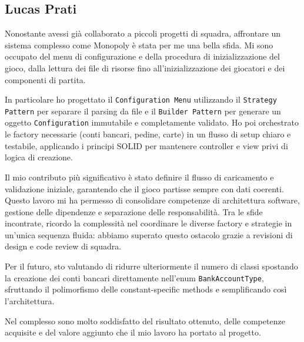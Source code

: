 \subsection{Lucas Prati}

Nonostante avessi già collaborato a piccoli progetti di squadra, affrontare un sistema complesso come Monopoly è stata per me una bella sfida.
Mi sono occupato del menu di configurazione e della procedura di inizializzazione del gioco, dalla lettura dei file di risorse fino all'inizializzazione dei giocatori e dei componenti di partita. \newline

In particolare ho progettato il \texttt{Configuration Menu} utilizzando il \texttt{Strategy Pattern} per separare il parsing da file e il \texttt{Builder Pattern} per generare un oggetto \texttt{Configuration} immutabile e completamente validato.
Ho poi orchestrato le factory necessarie (conti bancari, pedine, carte) in un flusso di setup chiaro e testabile, applicando i principi SOLID per mantenere controller e view privi di logica di creazione. \newline

Il mio contributo più significativo è stato definire il flusso di caricamento e validazione iniziale, garantendo che il gioco partisse sempre con dati coerenti.
Questo lavoro mi ha permesso di consolidare competenze di architettura software, gestione delle dipendenze e separazione delle responsabilità.
Tra le sfide incontrate, ricordo la complessità nel coordinare le diverse factory e strategie in un'unica sequenza fluida: abbiamo superato questo ostacolo grazie a revisioni di design e code review di squadra. \newline

Per il futuro, sto valutando di ridurre ulteriormente il numero di classi spostando la creazione dei conti bancari direttamente nell'enum \texttt{BankAccountType}, sfruttando il polimorfismo delle constant-specific methods e semplificando così l'architettura. \newline

Nel complesso sono molto soddisfatto del risultato ottenuto, delle competenze acquisite e del valore aggiunto che il mio lavoro ha portato al progetto.
